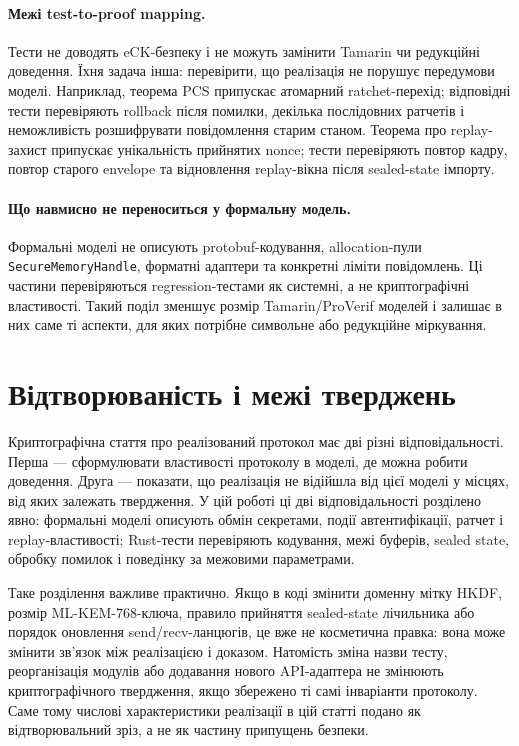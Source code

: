 \documentclass[11pt,a4paper]{article}
\theoremstyle{definition}
\newcommand{\HKDF}{\textsf{HKDF}}
\newcommand{\KEM}{\textsf{ML-KEM-768}}
\newcommand{\eCK}{\textsf{eCK}}
\begin{document}
\paragraph{Межі test-to-proof mapping.}
Тести не доводять \eCK{}-безпеку і не можуть замінити Tamarin чи
редукційні доведення. Їхня задача інша: перевірити, що реалізація не
порушує передумови моделі. Наприклад, теорема PCS припускає
атомарний ratchet-перехід; відповідні тести перевіряють rollback
після помилки, декілька послідовних ратчетів і неможливість
розшифрувати повідомлення старим станом. Теорема про replay-захист
припускає унікальність прийнятих nonce; тести перевіряють повтор
кадру, повтор старого envelope та відновлення replay-вікна
після sealed-state імпорту.

\paragraph{Що навмисно не переноситься у формальну модель.}
Формальні моделі не описують protobuf-кодування, allocation-пули
\texttt{SecureMemoryHandle}, форматні адаптери та конкретні
ліміти повідомлень. Ці частини перевіряються regression-тестами як
системні, а не криптографічні властивості. Такий поділ
зменшує розмір Tamarin/ProVerif моделей і залишає в них саме ті
аспекти, для яких потрібне символьне або редукційне міркування.

\section{Відтворюваність і межі тверджень}\label{sec:reproducibility}

Криптографічна стаття про реалізований протокол має дві різні
відповідальності. Перша — сформулювати властивості протоколу в моделі,
де можна робити доведення. Друга — показати, що реалізація не відійшла
від цієї моделі у місцях, від яких залежать твердження. У цій роботі ці
дві відповідальності розділено явно: формальні моделі описують обмін
секретами, події автентифікації, ратчет і replay-властивості; Rust-тести
перевіряють кодування, межі буферів, sealed state,
обробку помилок і поведінку за межовими параметрами.

Таке розділення важливе практично. Якщо в коді змінити доменну мітку
\HKDF{}, розмір \KEM{}-ключа, правило прийняття sealed-state лічильника
або порядок оновлення send/recv-ланцюгів, це вже не косметична правка:
вона може змінити зв'язок між реалізацією і доказом. Натомість зміна
назви тесту, реорганізація модулів або додавання нового API-адаптера не
змінюють криптографічного твердження, якщо збережено ті самі інваріанти
протоколу. Саме тому числові характеристики реалізації в цій статті
подано як відтворювальний зріз, а не як частину припущень безпеки.
\end{document}
